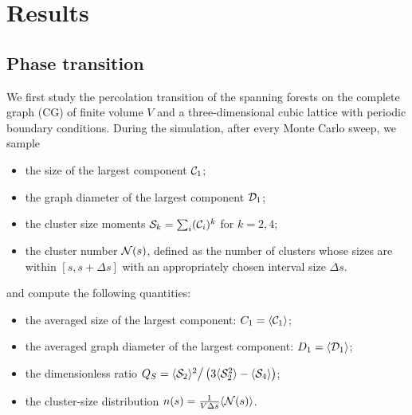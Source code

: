 \chapter{Results}\label{chap:results}

\section{Phase transition}\label{sec:phase_transition}
We first study the percolation transition of the spanning forests on the complete graph (CG) of finite volume $V$ and
a three-dimensional cubic lattice with periodic boundary conditions. During the simulation, after every Monte Carlo sweep, we sample 
\begin{itemize}
	\item the size of the largest component ${\mathcal C}_1$;
	\item the graph diameter of the largest component ${\mathcal D}_1$;
	\item the cluster size moments ${\mathcal S}_k = \sum_i ({\mathcal C}_i)^k$ for $k=2, 4$;
	\item the cluster number ${\mathcal N}(s)$, defined as the number of clusters whose sizes are within $[s, s + \Delta s]$ 
	with an appropriately chosen interval size $\Delta s$.

\end{itemize}
and compute the following quantities:
\begin{itemize}
	\item the averaged size of the largest component: $C_1 = \langle {\mathcal C}_1 \rangle$;
	\item the averaged graph diameter of the largest component: $D_1 = \langle {\mathcal D}_1 \rangle$;
	\item the dimensionless ratio\cite{Qian2005} $Q_S = \langle {\mathcal S}_2\rangle^2\big/\left(3\langle {\mathcal S}_2^2 \rangle - \langle {\mathcal S}_4\rangle\right)$;
	\item the cluster-size distribution $n(s)= \frac{1}{V\Delta s} \langle {\mathcal N}(s)\rangle$.
\end{itemize}

